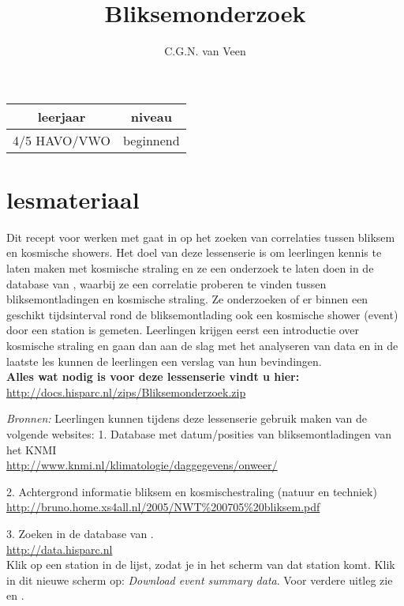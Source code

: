 
\usepackage{xfrac}
\usepackage{array}

\title{Bliksemonderzoek}
\author{C.G.N. van Veen}



\maketitle

\begin{tabular}{|c|c|}
\hline 
leerjaar & niveau \tabularnewline
\hline 
4/5 HAVO/VWO  & beginnend \tabularnewline
\hline 
\end{tabular}

\section{lesmateriaal}

Dit recept voor werken met \hisparc gaat in op het zoeken van correlaties tussen 
bliksem en kosmische showers. Het doel van deze lessenserie is om leerlingen 
kennis te laten maken met kosmische straling en ze een onderzoek te laten doen 
in de database van \hisparc, waarbij ze een correlatie proberen te vinden tussen 
bliksemontladingen en kosmische straling. Ze onderzoeken of er binnen een geschikt
tijdsinterval rond de bliksemontlading ook een kosmische shower (event) door 
een \hisparc station is gemeten.
Leerlingen krijgen eerst een introductie over kosmische straling en gaan
dan aan de slag met het analyseren van \hisparc data en
in de laatste les kunnen de leerlingen een verslag van hun bevindingen.
\\

\textbf{Alles wat nodig is voor deze lessenserie vindt u hier:}\\
\url{http://docs.hisparc.nl/zips/Bliksemonderzoek.zip}


\textit{Bronnen:} Leerlingen kunnen tijdens deze lessenserie gebruik maken van de 
volgende websites:
1. Database met datum/posities van bliksemontladingen van het KNMI\\
\url{ http://www.knmi.nl/klimatologie/daggegevens/onweer/}

2. Achtergrond informatie bliksem en kosmischestraling (natuur en techniek)\\
\url{ http://bruno.home.xs4all.nl/2005/NWT%200705%20bliksem.pdf}

3. Zoeken in de database van \hisparc.\\
\url{http://data.hisparc.nl}\\
Klik op een station in de lijst, zodat je in het scherm van dat station komt.
Klik in dit nieuwe scherm op: \textit{Download event summary data}.
Voor verdere uitleg zie  en .


